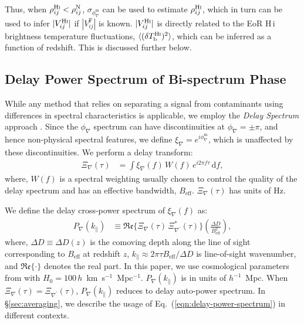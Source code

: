 \documentclass[
reprint,
superscriptaddress,
amsmath,
amssymb,
aps,
prd
]{revtex4-1}
\begin{document}
Thus, when $\rho_{ij}^\textrm{H{\sc i}} < \rho_{ij}^\textrm{N}$, $\sigma_{\phi_\nabla^\textrm{m}}$ can be used to estimate $\rho_{ij}^\textrm{H{\sc i}}$, which in turn can be used to infer $|V_{ij}^\textrm{H{\sc i}}|$ if $|V_{ij}^\textrm{F}|$ is known. $|V_{ij}^\textrm{H{\sc i}}|$ is directly related to the EoR H\,{\sc i} brightness temperature fluctuations, $\langle(\delta T_\textrm{b}^\textrm{H{\sc i}})^2\rangle$, which can be inferred as a function of  redshift. This is discussed further below.

\subsection{Delay Power Spectrum of Bi-spectrum Phase}\label{sec:cp-FG-wedge}

While any method that relies on separating a signal from contaminants using differences in spectral characteristics is applicable, we employ the {\it Delay Spectrum} approach \cite{par12a,par12b}. Since the $\phi_\nabla$ spectrum can have discontinuities at $\phi_\nabla=\pm\pi$, and hence non-physical spectral features, we define $\xi_\nabla = e^{i\phi_\nabla^\textrm{m}}$, which is unaffected by these discontinuities. We perform a delay transform:
\begin{align}\label{eqn:cpdspec}
  \Xi_\nabla(\tau) &= \int \xi_\nabla(f)\,W(f)\,e^{i2\pi f\tau}\,\mathrm{d}f,
\end{align}
where, $W(f)$ is a spectral weighting usually chosen to control the quality of the delay spectrum \citep{thy13,thy16} and has an effective bandwidth, $B_\textrm{eff}$. $\Xi_\nabla(\tau)$ has units of Hz. 

We define the delay cross-power spectrum of $\xi_\nabla(f)$ as:
\begin{align}
  P_\nabla(k_\parallel) &\equiv \mathfrak{Re}\bigg\{\Xi_\nabla(\tau)\,\Xi_{\nabla^\prime}^*(\tau)\bigg\} \left(\frac{\Delta D}{B_\textrm{eff}^2}\right), \label{eqn:delay-power-spectrum}
\end{align}
where, $\Delta D\equiv \Delta D(z)$ is the comoving depth along the line of sight corresponding to $B_\textrm{eff}$ at redshift $z$, $k_\parallel\approx 2\pi\tau B_\textrm{eff}/\Delta D$ is line-of-sight wavenumber, and $\mathfrak{Re}\{\cdot\}$ denotes the real part. In this paper, we use cosmological parameters from \cite{planck15xiii} with $H_0=100\,h$~km~s$^{-1}$~Mpc$^{-1}$. $P_\nabla(k_\parallel)$ is in units of $h^{-1}$~Mpc. When $\Xi_\nabla(\tau)=\Xi_{\nabla^\prime}(\tau)$, $P_\nabla(k_\parallel)$ reduces to delay auto-power spectrum. In \S\ref{sec:averaging}, we describe the usage of Eq.~(\ref{eqn:delay-power-spectrum}) in different contexts. 
\end{document}

